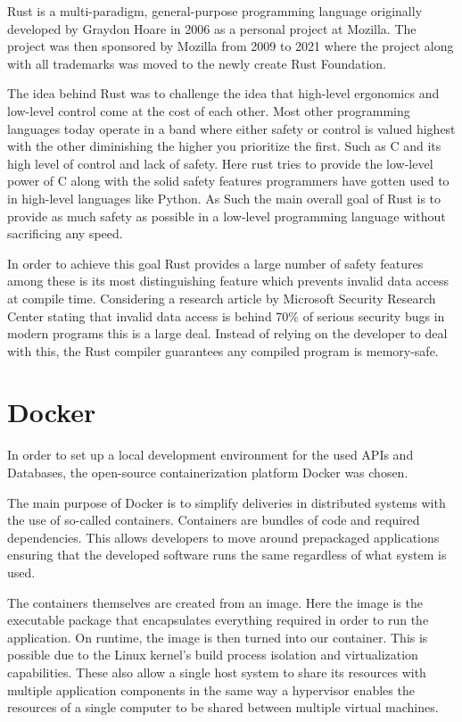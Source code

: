 Rust is a multi-paradigm, general-purpose programming language originally developed by Graydon Hoare in 2006 as a personal project at Mozilla. 
The project was then sponsored by Mozilla from 2009 to 2021 where the project along with all trademarks was moved to the newly create Rust Foundation. 

The idea behind Rust was to challenge the idea that high-level ergonomics and low-level control come at the cost of each other\cite{Rust_Book}.
Most other programming languages today operate in a band where either safety or control is valued highest with the other diminishing the higher you prioritize the first. Such as C and its high level of control and lack of safety. 
Here rust tries to provide the low-level power of C along with the solid safety features programmers have gotten used to in high-level languages like Python. 
As Such the main overall goal of Rust is to provide as much safety as possible in a low-level programming language without sacrificing any speed\cite{Rust_in_Action}.

In order to achieve this goal Rust provides a large number of safety features among these is its most distinguishing feature which prevents invalid data access at compile time. 
Considering a research article by Microsoft Security Research Center stating that invalid data access is behind 70\% of serious security bugs in modern programs this is a large deal\cite{Safe_Systems_Languages}. 
Instead of relying on the developer to deal with this, the Rust compiler guarantees any compiled program is memory-safe.


\section*{Docker}
In order to set up a local development environment for the used APIs and Databases, the open-source containerization platform Docker was chosen. 

The main purpose of Docker is to simplify deliveries in distributed systems with the use of so-called containers\cite{Docker_Container}.
Containers are bundles of code and required dependencies. This allows developers to move around prepackaged applications ensuring that the developed software runs the same regardless of what system is used\cite{Docker_Container}.

The containers themselves are created from an image. Here the image is the executable package that encapsulates everything required in order to run the application. On runtime, the image is then turned into our container. 
This is possible due to the Linux kernel's build process isolation and virtualization capabilities. These also allow a single host system to share its resources with multiple application components in the same way a hypervisor enables the resources of a single computer to be shared between multiple virtual machines\cite{Docker_Container}.

